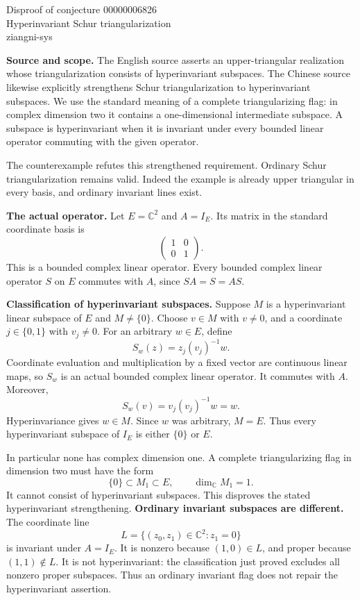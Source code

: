 \documentclass[11pt]{article}
\begin{document}
\begin{center}
{\Large Disproof of conjecture 00000006826}\\[5pt]
Hyperinvariant Schur triangularization\\
ziangni-sys
\end{center}
\textbf{Source and scope.}
The English source asserts an upper-triangular realization whose triangularization consists of hyperinvariant subspaces. The Chinese source likewise explicitly strengthens Schur triangularization to hyperinvariant subspaces. We use the standard meaning of a complete triangularizing flag: in complex dimension two it contains a one-dimensional intermediate subspace. A subspace is hyperinvariant when it is invariant under every bounded linear operator commuting with the given operator.

The counterexample refutes this strengthened requirement. Ordinary Schur triangularization remains valid. Indeed the example is already upper triangular in every basis, and ordinary invariant lines exist.

\textbf{The actual operator.}
Let $E=\mathbb C^2$ and $A=I_E$. Its matrix in the standard coordinate basis is
\[
 \begin{pmatrix}1&0\\0&1\end{pmatrix}.
\]
This is a bounded complex linear operator. Every bounded complex linear operator $S$ on $E$ commutes with $A$, since $SA=S=AS$.

\textbf{Classification of hyperinvariant subspaces.}
Suppose $M$ is a hyperinvariant linear subspace of $E$ and $M\ne\{0\}$. Choose $v\in M$ with $v\ne0$, and a coordinate $j\in\{0,1\}$ with $v_j\ne0$. For an arbitrary $w\in E$, define
\[
 S_w(z)=z_j(v_j)^{-1}w .
\]
Coordinate evaluation and multiplication by a fixed vector are continuous linear maps, so $S_w$ is an actual bounded complex linear operator. It commutes with $A$. Moreover,
\[
 S_w(v)=v_j(v_j)^{-1}w=w .
\]
Hyperinvariance gives $w\in M$. Since $w$ was arbitrary, $M=E$. Thus every hyperinvariant subspace of $I_E$ is either $\{0\}$ or $E$.

In particular none has complex dimension one. A complete triangularizing flag in dimension two must have the form
\[
 \{0\}\subset M_1\subset E,\qquad \dim_{\mathbb C}M_1=1.
\]
It cannot consist of hyperinvariant subspaces. This disproves the stated hyperinvariant strengthening.
\newpage
\textbf{Ordinary invariant subspaces are different.}
The coordinate line
\[
 L=\{(z_0,z_1)\in\mathbb C^2:z_1=0\}
\]
is invariant under $A=I_E$. It is nonzero because $(1,0)\in L$, and proper because $(1,1)\notin L$. It is not hyperinvariant: the classification just proved excludes all nonzero proper subspaces. Thus an ordinary invariant flag does not repair the hyperinvariant assertion.
\end{document}
